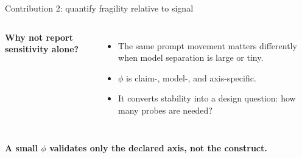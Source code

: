 \documentclass[aspectratio=169,10pt]{beamer}
\begin{document}
\begin{frame}{Contribution 2: quantify fragility relative to signal}
  \begin{columns}[c,onlytextwidth]
      \textbf{Why not report sensitivity alone?}
      \begin{itemize}\setlength\itemsep{0.25cm}
        \item The same prompt movement matters differently when model separation is large or tiny.
        \item $\phi$ is claim-, model-, and axis-specific.
        \item It converts stability into a design question: how many probes are needed?
      \end{itemize}
  \end{columns}
  \vspace{0.35cm}
  {\centering\color{red}\bfseries A small $\phi$ validates only the declared axis, not the construct.\par}
\end{frame}
\end{document}
